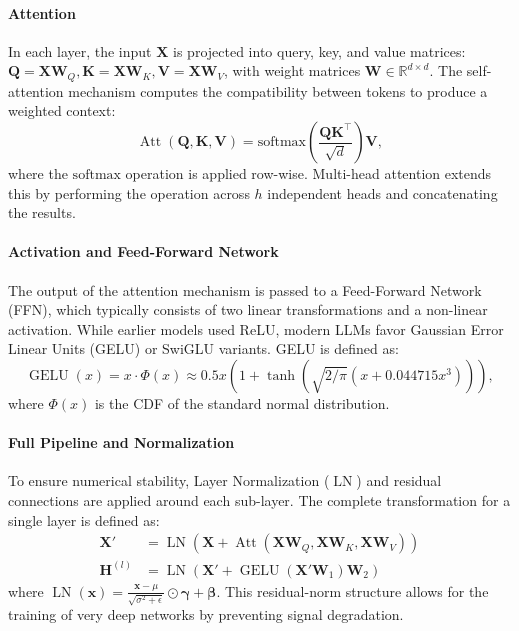\documentclass{article}
\newcommand{\RR}{\mathbb{R}}          %
\newcommand{\bx}{\mathbf{x}}
\newcommand{\bX}{\mathbf{X}}
\newcommand{\bW}{\mathbf{W}}
\newcommand{\bQ}{\mathbf{Q}}
\newcommand{\bH}{\mathbf{H}}
\newcommand{\bK}{\mathbf{K}}
\newcommand{\bV}{\mathbf{V}}
\newcommand{\bbeta}{\mathbf{\beta}}
\newcommand{\bgamma}{\mathbf{\gamma}}
\newcommand{\softmax}{\mathrm{softmax}}
\DeclareMathOperator{\LN}{LN}
\DeclareMathOperator{\GELU}{GELU}
\DeclareMathOperator{\Att}{Att}
\begin{document}
\paragraph{Attention}
In each layer, the input $\bX$ is projected into query, key, and value matrices: $\bQ = \bX\bW_Q, \bK = \bX\bW_K, \bV = \bX\bW_V$, with weight matrices $\bW \in \RR^{d \times d}$. The self-attention mechanism computes the compatibility between tokens to produce a weighted context:
\begin{equation}
  \Att(\bQ, \bK, \bV) = \softmax\!\left(\frac{\bQ\bK^\top}{\sqrt{d}}\right)\bV,
  \label{eq:softmax-attn}
\end{equation}
where the $\softmax$ operation is applied row-wise. Multi-head attention extends this by performing the operation across $h$ independent heads and concatenating the results.

\paragraph{Activation and Feed-Forward Network}
The output of the attention mechanism is passed to a Feed-Forward Network (FFN), which typically consists of two linear transformations and a non-linear activation. While earlier models used ReLU, modern LLMs favor Gaussian Error Linear Units (GELU) or SwiGLU variants. GELU is defined as:
\begin{equation}
  \GELU(x) = x \cdot \Phi(x) \approx 0.5x \left( 1 + \tanh\left( \sqrt{2/\pi}(x + 0.044715x^3) \right) \right),
\end{equation}
where $\Phi(x)$ is the CDF of the standard normal distribution.

\paragraph{Full Pipeline and Normalization}
To ensure numerical stability, Layer Normalization ($\LN$) and residual connections are applied around each sub-layer. The complete transformation for a single layer is defined as:
\begin{align}
    \bX' &= \LN(\bX + \Att(\bX\bW_Q, \bX\bW_K, \bX\bW_V)) \\
    \bH^{(l)} &= \LN(\bX' + \GELU(\bX'\bW_1)\bW_2)
\end{align}
where $\LN(\bx) = \frac{\bx - \mu}{\sqrt{\sigma^2 + \epsilon}} \odot \bgamma + \bbeta$. This residual-norm structure allows for the training of very deep networks by preventing signal degradation.
\end{document}
